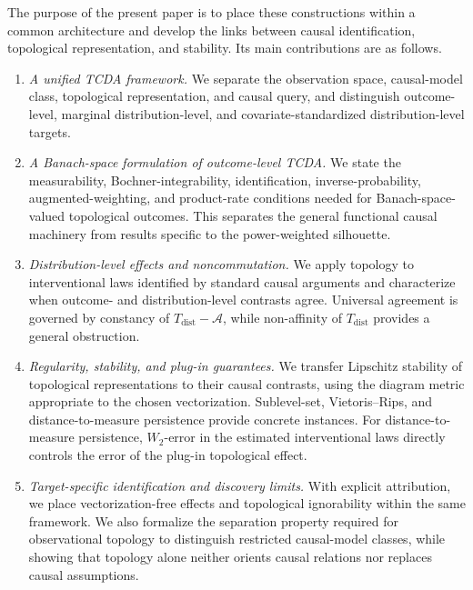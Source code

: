 \documentclass[11pt,a4paper]{article}
\theoremstyle{plain}
\theoremstyle{definition}
\theoremstyle{remark}
\newcommand{\1}{\mathbbm{1}}
\begin{document}
The purpose of the present paper is to place these constructions within a common architecture and develop the links between causal identification, topological representation, and stability. Its main contributions are as follows.

\begin{enumerate}
\item \emph{A unified TCDA framework.}
We separate the observation space, causal-model class, topological representation, and causal query, and distinguish outcome-level, marginal distribution-level, and covariate-standardized distribution-level targets.

\item \emph{A Banach-space formulation of outcome-level TCDA.}
We state the measurability, Bochner-integrability, identification, inverse-probability, augmented-weighting, and product-rate conditions needed for Banach-space-valued topological outcomes. This separates the general functional causal machinery from results specific to the power-weighted silhouette.

\item \emph{Distribution-level effects and noncommutation.}
We apply topology to interventional laws identified by standard causal arguments and characterize when outcome- and distribution-level contrasts agree. Universal agreement is governed by constancy of
\(T_{\mathrm{dist}}-\mathcal A\), while non-affinity of
\(T_{\mathrm{dist}}\) provides a general obstruction.

\item \emph{Regularity, stability, and plug-in guarantees.}
We transfer Lipschitz stability of topological representations to their causal contrasts, using the diagram metric appropriate to the chosen vectorization. Sublevel-set, Vietoris--Rips, and distance-to-measure persistence provide concrete instances. For distance-to-measure persistence, \(W_2\)-error in the estimated interventional laws directly controls the error of the plug-in topological effect.

\item \emph{Target-specific identification and discovery limits.}
With explicit attribution, we place vectorization-free effects and topological ignorability within the same framework. We also formalize the separation property required for observational topology to distinguish restricted causal-model classes, while showing that topology alone neither orients causal relations nor replaces causal assumptions.
\end{enumerate}
\end{document}
